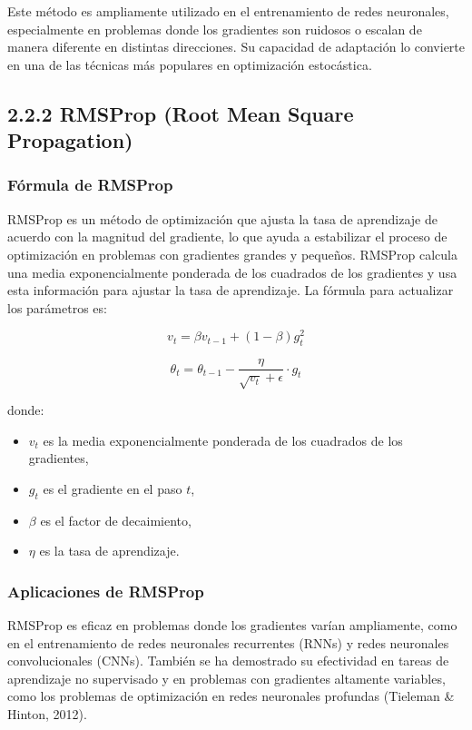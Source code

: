 \documentclass{article}
\begin{document}
Este método es ampliamente utilizado en el entrenamiento de redes neuronales, especialmente en problemas donde los gradientes son ruidosos o escalan de manera diferente en distintas direcciones. Su capacidad de adaptación lo convierte en una de las técnicas más populares en optimización estocástica.

\subsection*{2.2.2 RMSProp (Root Mean Square Propagation)}

\subsubsection*{Fórmula de RMSProp}

RMSProp es un método de optimización que ajusta la tasa de aprendizaje de acuerdo con la magnitud del gradiente, lo que ayuda a estabilizar el proceso de optimización en problemas con gradientes grandes y pequeños. RMSProp calcula una media exponencialmente ponderada de los cuadrados de los gradientes y usa esta información para ajustar la tasa de aprendizaje. La fórmula para actualizar los parámetros es:

\[
v_t = \beta v_{t-1} + (1 - \beta) g_t^2
\]

\[
\theta_t = \theta_{t-1} - \frac{\eta}{\sqrt{v_t} + \epsilon} \cdot g_t
\]

donde:
\begin{itemize}
	\item \( v_t \) es la media exponencialmente ponderada de los cuadrados de los gradientes,
	\item \( g_t \) es el gradiente en el paso \( t \),
	\item \( \beta \) es el factor de decaimiento,
	\item \( \eta \) es la tasa de aprendizaje.
\end{itemize}

\subsubsection*{Aplicaciones de RMSProp}

RMSProp es eficaz en problemas donde los gradientes varían ampliamente, como en el entrenamiento de redes neuronales recurrentes (RNNs) y redes neuronales convolucionales (CNNs). También se ha demostrado su efectividad en tareas de aprendizaje no supervisado y en problemas con gradientes altamente variables, como los problemas de optimización en redes neuronales profundas (Tieleman \& Hinton, 2012).
\end{document}
